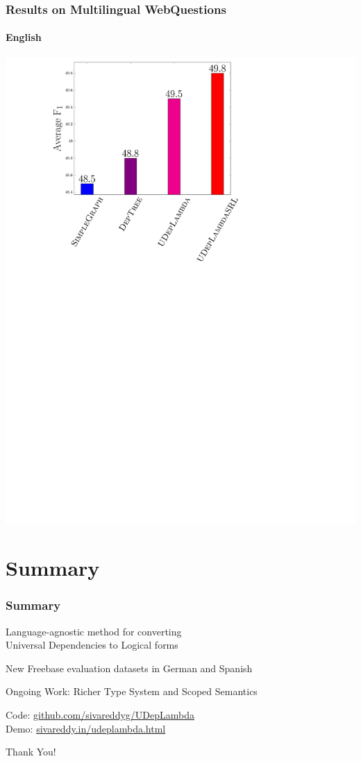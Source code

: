 \documentclass[mathserif,12pt]{beamer}
\newcommand{\hlight}[1]{{\color{blue!80} #1}}
\begin{document}
\begin{frame}
\frametitle{Results on Multilingual WebQuestions}
\framesubtitle{English}
\centering
\large
\vspace{0.4em}
\includegraphics[trim=9em 0em 22em 1em,clip=true,scale=0.45]{figures/deplambda_results_plot_ud}
\end{frame}

\section{Summary}
\begin{frame}
\frametitle{Summary}
\large
 
\vspace{1em} 
Language-agnostic method for converting \\Universal Dependencies to Logical forms

\vspace{2em}
New Freebase evaluation datasets in German and Spanish

\vspace{2em}
Ongoing Work: Richer Type System and Scoped Semantics

\vspace{2em}
Code: \hlight{\url{github.com/sivareddyg/UDepLambda}} \\
Demo: \hlight{\url{sivareddy.in/udeplambda.html}} \\

\begin{center}
 \large \hlight{Thank You!}
\end{center}
\end{frame}
\end{document}
